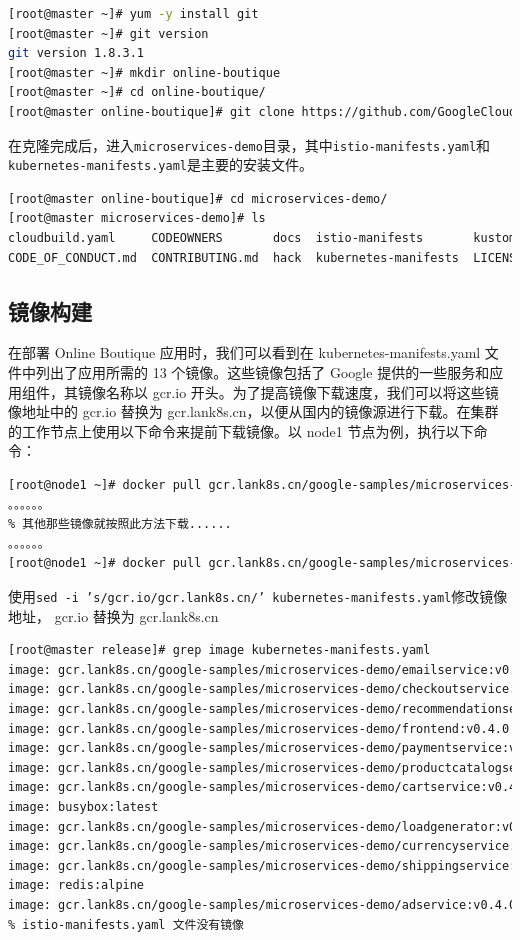 \begin{lstlisting}[language=bash]
[root@master ~]# yum -y install git
[root@master ~]# git version
git version 1.8.3.1
[root@master ~]# mkdir online-boutique
[root@master ~]# cd online-boutique/
[root@master online-boutique]# git clone https://github.com/GoogleCloudPlatform/microservices-demo.git
\end{lstlisting}

在克隆完成后，进入\texttt{microservices-demo}目录，其中\texttt{istio-manifests.yaml}和\texttt{kubernetes-manifests.yaml}是主要的安装文件。

\begin{lstlisting}[language=bash]
[root@master online-boutique]# cd microservices-demo/
[root@master microservices-demo]# ls
cloudbuild.yaml     CODEOWNERS       docs  istio-manifests       kustomize  pb         release        SECURITY.md    src
CODE_OF_CONDUCT.md  CONTRIBUTING.md  hack  kubernetes-manifests  LICENSE    README.md  renovate.json  skaffold.yaml  terraform
\end{lstlisting}

\subsection{镜像构建}
在部署 Online Boutique 应用时，我们可以看到在 kubernetes-manifests.yaml 文件中列出了应用所需的 13 个镜像。这些镜像包括了 Google 提供的一些服务和应用组件，其镜像名称以 gcr.io 开头。为了提高镜像下载速度，我们可以将这些镜像地址中的 gcr.io 替换为 gcr.lank8s.cn，以便从国内的镜像源进行下载。在集群的工作节点上使用以下命令来提前下载镜像。以 node1 节点为例，执行以下命令：
\begin{lstlisting}[language=bash]
[root@node1 ~]# docker pull gcr.lank8s.cn/google-samples/microservices-demo/emailservice:v0.7.0
。。。。。。
% 其他那些镜像就按照此方法下载......
。。。。。。
[root@node1 ~]# docker pull gcr.lank8s.cn/google-samples/microservices-demo/adservice:v0.7.0
\end{lstlisting}
使用\texttt{sed -i 's/gcr.io/gcr.lank8s.cn/' kubernetes-manifests.yaml}修改镜像地址， gcr.io 替换为 gcr.lank8s.cn
\begin{lstlisting}[language=bash]
% 此时kubernetes-manifests.yaml文件中的镜像就全被修改了
[root@master release]# grep image kubernetes-manifests.yaml
image: gcr.lank8s.cn/google-samples/microservices-demo/emailservice:v0.4.0
image: gcr.lank8s.cn/google-samples/microservices-demo/checkoutservice:v0.4.0
image: gcr.lank8s.cn/google-samples/microservices-demo/recommendationservice:v0.4.0
image: gcr.lank8s.cn/google-samples/microservices-demo/frontend:v0.4.0
image: gcr.lank8s.cn/google-samples/microservices-demo/paymentservice:v0.4.0
image: gcr.lank8s.cn/google-samples/microservices-demo/productcatalogservice:v0.4.0
image: gcr.lank8s.cn/google-samples/microservices-demo/cartservice:v0.4.0
image: busybox:latest
image: gcr.lank8s.cn/google-samples/microservices-demo/loadgenerator:v0.4.0
image: gcr.lank8s.cn/google-samples/microservices-demo/currencyservice:v0.4.0
image: gcr.lank8s.cn/google-samples/microservices-demo/shippingservice:v0.4.0
image: redis:alpine
image: gcr.lank8s.cn/google-samples/microservices-demo/adservice:v0.4.0
% istio-manifests.yaml 文件没有镜像
\end{lstlisting}

